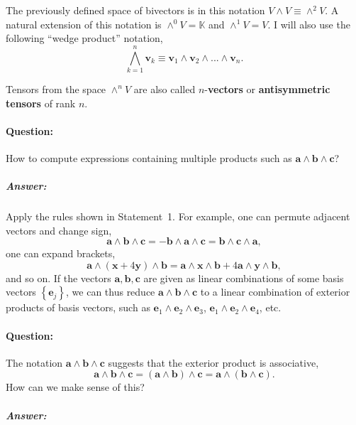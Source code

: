 The previously defined space of bivectors is in this notation $V\wedge V\equiv\wedge^{2}V$.
A natural extension of this notation is $\wedge^{0}V=\mathbb{K}$
and $\wedge^{1}V=V$. I will also use the following {}``wedge product''
notation,\[
\bigwedge_{k=1}^{n}\mathbf{v}_{k}\equiv\mathbf{v}_{1}\wedge\mathbf{v}_{2}\wedge...\wedge\mathbf{v}_{n}.\]


Tensors from the space $\wedge^{n}V$ are also called $n$-\textbf{vectors}
or \textbf{antisymmetric tensors} of
rank $n$.


\paragraph{Question:}

How to compute expressions containing multiple products such as $\mathbf{a}\wedge\mathbf{b}\wedge\mathbf{c}$?


\subparagraph{Answer:}

Apply the rules shown in Statement~1. For example, one can permute
adjacent vectors and change sign,\[
\mathbf{a}\wedge\mathbf{b}\wedge\mathbf{c}=-\mathbf{b}\wedge\mathbf{a}\wedge\mathbf{c}=\mathbf{b}\wedge\mathbf{c}\wedge\mathbf{a},\]
one can expand brackets,\[
\mathbf{a}\wedge(\mathbf{x}+4\mathbf{y})\wedge\mathbf{b}=\mathbf{a}\wedge\mathbf{x}\wedge\mathbf{b}+4\mathbf{a}\wedge\mathbf{y}\wedge\mathbf{b},\]
and so on. If the vectors $\mathbf{a},\mathbf{b},\mathbf{c}$ are
given as linear combinations of some basis vectors $\left\{ \mathbf{e}_{j}\right\} $,
we can thus reduce $\mathbf{a}\wedge\mathbf{b}\wedge\mathbf{c}$ to
a linear combination of exterior products of basis vectors, such as
$\mathbf{e}_{1}\wedge\mathbf{e}_{2}\wedge\mathbf{e}_{3}$, $\mathbf{e}_{1}\wedge\mathbf{e}_{2}\wedge\mathbf{e}_{4}$,
etc.


\paragraph{Question:}

The notation $\mathbf{a}\wedge\mathbf{b}\wedge\mathbf{c}$ suggests
that the exterior product is associative,\[
\mathbf{a}\wedge\mathbf{b}\wedge\mathbf{c}=\left(\mathbf{a}\wedge\mathbf{b}\right)\wedge\mathbf{c}=\mathbf{a}\wedge(\mathbf{b}\wedge\mathbf{c}).\]
How can we make sense of this?


\subparagraph{Answer:}

